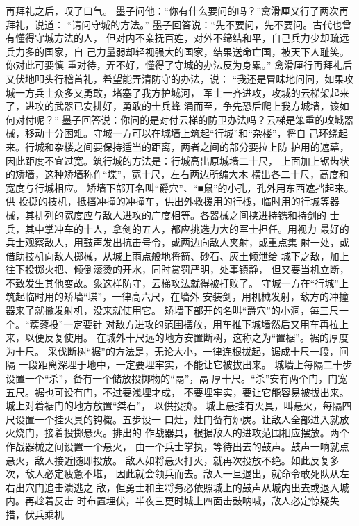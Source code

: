 \documentclass[12pt,UTF8]{ctexbook}
\begin{document}
再拜礼之后，叹了口气。 
墨子问他：“你有什么要问的吗？”禽滑厘又行了两次再拜礼，说道： 
“请问守城的方法。” 
墨子回答说：“先不要问，先不要问。古代也曾有懂得守城方法的人， 
但对内不亲抚百姓，对外不缔结和平，自己兵力少却疏远兵力多的国家，自 
己力量弱却轻视强大的国家，结果送命亡国，被天下人耻笑。你对此可要慎 
重对待，弄不好，懂得了守城的办法反为身累。” 
禽滑厘行再拜礼后又伏地叩头行稽首礼，希望能弄清防守的办法，说： 
“我还是冒昧地问问，如果攻城一方兵士众多又勇敢，堵塞了我方护城河， 
军士一齐进攻，攻城的云梯架起来了，进攻的武器已安排好，勇敢的士兵蜂 
涌而至，争先恐后爬上我方城墙，该如何对付呢？” 
墨子回答说：你问的是对付云梯的防卫办法吗？云梯是笨重的攻城器 
械，移动十分困难。守城一方可以在城墙上筑起“行城”和“杂楼”，将自 
己环绕起来。行城和杂楼之间要保持适当的距离，两者之间的部分要拉上防 
护用的遮幕，因此距度不宜过宽。筑行城的方法是：行城高出原城墙二十尺， 
上面加上锯齿状的矫墙，这种矫墙称作“堞”，宽十尺，左右两边所编大木 
横出各二十尺，高度和宽度与行城相应。 
矫墙下部开名叫“爵穴”、“■鼠”的小孔，孔外用东西遮挡起来。供 
投掷的技机，抵挡冲撞的冲撞车，供出外救援用的行栈，临时用的行城等器 
械，其排列的宽度应与敌人进攻的广度相等。各器械之间挟进持镌和持剑的 
士兵，其中掌冲车的十人，拿剑的五人，都应挑选力大的军士担任。用视力 
最好的兵士观察敌人，用鼓声发出抗击号令，或两边向敌人夹射，或重点集 
射一处，或借助技机向敌人掷械，从城上雨点般地将箭、砂石、灰土倾泄给 
城下之敌，加上往下投掷火把、倾倒滚烫的开水，同时赏罚严明，处事镇静， 
但又要当机立断，不致发生其他变故。象这样防守，云梯攻法就得被打败了。 
守城一方在“行城”上筑起临时用的矫墙“堞”，一律高六尺，在墙外 
安装剑，用机械发射，敌方的冲撞器来了就撤发射机，没来就使用它。 
矫墙下部开的名叫“爵穴”的小洞，每三尺一个。“蒺藜投”一定要针 
对敌方进攻的范围摆放，用车推下城墙然后又用车再拉上来，以便反复使用。 
在城外十尺远的地方安置断树，这称之为“置裾”。裾的厚度为十尺。 
采伐断树“裾”的方法是，无论大小，一律连根拔起，锯成十尺一段，间隔 
一段距离深埋于地中，一定要埋牢实，不能让它被拔出来。 
城墙上每隔二十步设置一个“杀”，备有一个储放投掷物的“鬲”，鬲 
厚十尺。“杀”安有两个门，门宽五尺。裾也可设有门，不过要浅埋才成， 
不要埋牢实，要让它能容易被拔出来。城上对着裾门的地方放置“桀石”， 
以供投掷。 
城上悬挂有火具，叫悬火，每隔四尺设置一个挂火具的钩樴。五步设一 
口灶，灶门备有炉炭。让敌人全部进入就放火烧门，接着投掷悬火。排出的 
作战器具，根据敌人的进攻范围相应摆放。两个作战器械之间设置一个悬火， 
由一个兵士掌执，等待出去的鼓声。鼓声一响就点悬火，敌人接近随即投放。 
敌人如将悬火打灭，就再次投放不绝。如此反复多次，敌人必定疲惫不堪， 
因此就会领兵而去。敌人一旦退出，就命令敢死队从左右出穴门追击溃逃之 
敌，但勇士和主将务必依照城上的鼓声从城内出去或退入城内。再趁着反击 
时布置埋伏，半夜三更时城上四面击鼓呐喊，敌人必定惊疑失措，伏兵乘机 
\end{document}

